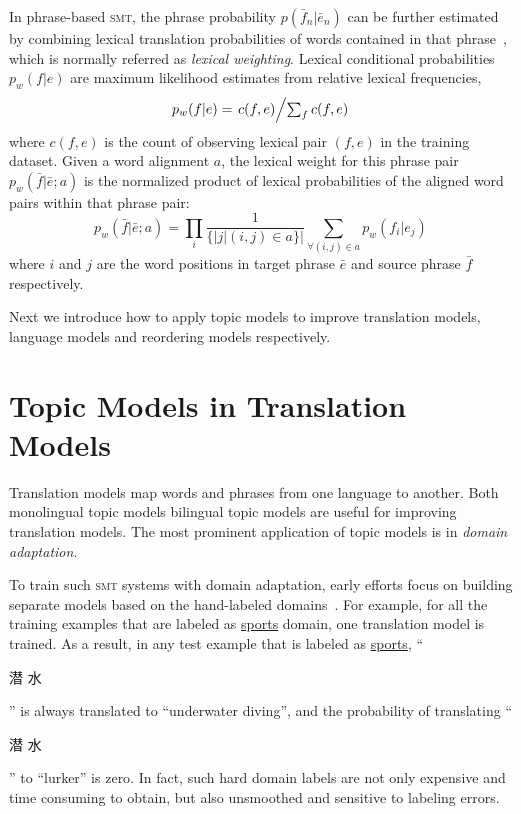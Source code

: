 In phrase-based \textsc{smt}, the phrase probability $p(\bar{f}_n |
\bar{e}_n)$ can be further estimated by combining lexical translation
probabilities of words contained in that phrase~\citep{koehn-03},
which is normally referred as \textit{lexical weighting}. Lexical
conditional probabilities $p_w(f|e)$ are maximum likelihood estimates
from relative lexical frequencies,
\begin{equation}
\label{eq:lexical_prob}
p_w(f|e) = \textstyle \left.c(f, e)\middle/\sum_f{c(f, e)}\right.
\end{equation}
where $c(f, e)$ is the count of observing lexical pair $(f, e)$ in the
training dataset. Given a word alignment $a$, the lexical weight for
this phrase pair $p_w(\bar{f} | \bar{e}; a)$ is the normalized product
of lexical probabilities of the aligned word pairs within that phrase
pair:
\begin{equation}
\label{eq:phrase_prob}
p_w(\bar{f} | \bar{e}; a) = \prod_{i} \frac{1}{\{|j | (i, j) \in a\}|} \sum_{\forall (i,j) \in a} p_w(f_i | e_j)
\end{equation}
where $i$ and $j$ are the word positions in target phrase $\bar{e}$
and source phrase $\bar{f}$ respectively.

Next we introduce how to apply topic models to improve translation
models, language models and reordering models respectively.


\section{Topic Models in Translation Models}

Translation models map words and phrases from one language to another.
Both monolingual topic models bilingual topic models are useful for improving translation models.
The most prominent application of topic models is in {\em domain adaptation}.

To train such \textsc{smt} systems with domain adaptation, early
efforts focus on building separate models based on the hand-labeled
domains~\citep{foster-07,matsoukas-09,chiang-11}. For example, for all
the training examples that are labeled as \underline{sports} domain,
one translation model is trained. As a result, in any test example
that is labeled as \underline{sports}, ``\begin{CJK*}{UTF8}{gbsn}潜
  水\end{CJK*}'' is always translated to ``underwater diving'', and
  the probability of translating ``\begin{CJK*}{UTF8}{gbsn}潜
    水\end{CJK*}'' to ``lurker'' is zero. In fact, such hard domain
    labels are not only expensive and time consuming to obtain, but
    also unsmoothed and sensitive to labeling errors.

